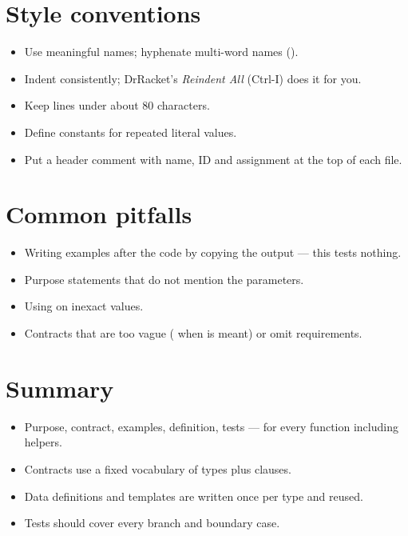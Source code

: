 \section{Style conventions}
\begin{itemize}
  \item Use meaningful names; hyphenate multi-word names ().
  \item Indent consistently; DrRacket's \emph{Reindent All} (Ctrl-I) does it for you.
  \item Keep lines under about 80 characters.
  \item Define constants for repeated literal values.
  \item Put a header comment with name, ID and assignment at the top of each file.
\end{itemize}

\section{Common pitfalls}
\begin{itemize}
  \item Writing examples after the code by copying the output --- this tests nothing.
  \item Purpose statements that do not mention the parameters.
  \item Using  on inexact values.
  \item Contracts that are too vague ( when  is meant) or omit requirements.
\end{itemize}

\section{Summary}
\begin{itemize}
  \item Purpose, contract, examples, definition, tests --- for every function including helpers.
  \item Contracts use a fixed vocabulary of types plus  clauses.
  \item Data definitions and templates are written once per type and reused.
  \item Tests should cover every branch and boundary case.
\end{itemize}
